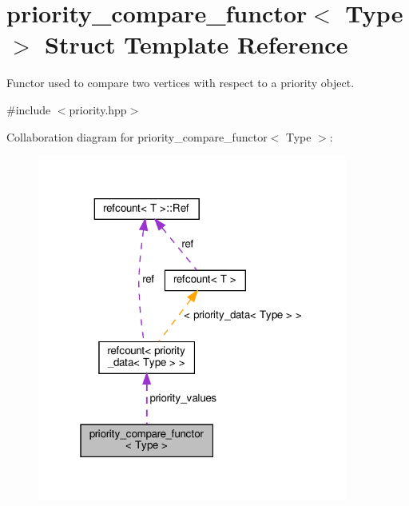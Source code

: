 \hypertarget{structpriority__compare__functor}{}\section{priority\+\_\+compare\+\_\+functor$<$ Type $>$ Struct Template Reference}
\label{structpriority__compare__functor}


Functor used to compare two vertices with respect to a priority object.  




{\ttfamily \#include $<$priority.\+hpp$>$}



Collaboration diagram for priority\+\_\+compare\+\_\+functor$<$ Type $>$\+:
\nopagebreak
\begin{figure}[H]
\begin{center}
\leavevmode
\includegraphics[width=289pt]{d6/d61/structpriority__compare__functor__coll__graph}
\end{center}
\end{figure}
